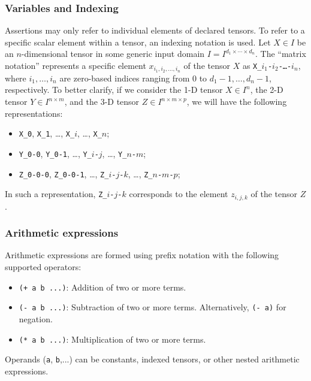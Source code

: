 \subsubsection*{Variables and Indexing}
\label{sec:variables-and-indexing}
Assertions may only refer to individual elements of declared tensors. To refer to a specific scalar element within a tensor, an indexing notation is used. Let $X \in I$ be an $n$-dimensional tensor 
in some generic input domain $I = I^{d_1 \times \cdots \times d_n}$. The ``matrix notation'' represents a specific element $x_{i_1, i_2, \dots, i_n}$ of the tensor $X$ as \texttt{X\_$i_1$-$i_2$-\dots-$i_n$}, 
where $i_1, \dots, i_n$ are zero-based indices ranging from $0$ to $d_1{-}1, \dots, d_n{-}1$, respectively. To better clarify, if we consider the 1-D tensor $X \in I^n$, the 2-D tensor 
$Y \in I^{n \times m}$, and the 3-D tensor $Z \in I^{n \times m \times p}$, we will have the following representations:
\begin{itemize}
    \item \texttt{X\_0}, \texttt{X\_1}, \dots, \texttt{X\_$i$}, \dots, \texttt{X\_$n$};
    \item \texttt{Y\_0-0}, \texttt{Y\_0-1}, \dots, \texttt{Y\_$i$-$j$}, \dots, \texttt{Y\_$n$-$m$};
    \item \texttt{Z\_0-0-0}, \texttt{Z\_0-0-1}, \dots, \texttt{Z\_$i$-$j$-$k$}, \dots, \texttt{Z\_$n$-$m$-$p$};
\end{itemize}
In such a representation, \texttt{Z\_$i$-$j$-$k$} corresponds to the element $z_{i,j,k}$ of the tensor $Z$. 

\subsubsection*{Arithmetic expressions}
Arithmetic expressions are formed using prefix notation with the following supported operators:
\begin{itemize}
    \item \texttt{(+ a b ...)}: Addition of two or more terms. 
    \item \texttt{(- a b ...)}: Subtraction of two or more terms. Alternatively, \texttt{(- a)} for negation.
    \item \texttt{(* a b ...)}: Multiplication of two or more terms. 
\end{itemize}
Operands (\texttt{a}, \texttt{b},...) can be constants, indexed tensors, or other nested arithmetic expressions.

